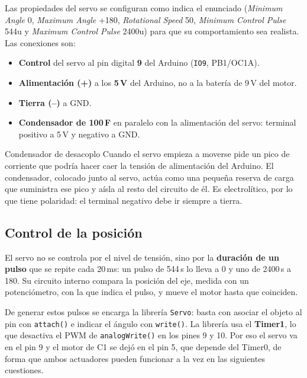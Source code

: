 \documentclass{upo-master}
\begin{document}
Las propiedades del servo se configuran como indica el enunciado
(\emph{Minimum Angle} 0, \emph{Maximum Angle} +180, \emph{Rotational Speed} 50,
\emph{Minimum Control Pulse} 544u y \emph{Maximum Control Pulse} 2400u) para
que su comportamiento sea realista. Las conexiones son:
\begin{itemize}
  \item \textbf{Control} del servo al pin digital \textbf{9} del Arduino
        (\texttt{IO9}, PB1/OC1A).
  \item \textbf{Alimentación (+)} a los \textbf{5\,V} del Arduino, no a la
        batería de 9\,V del motor.
  \item \textbf{Tierra (--)} a GND.
  \item \textbf{Condensador de 100\,\textmu F} en paralelo con la alimentación
        del servo: terminal positivo a 5\,V y negativo a GND.
\end{itemize}

\begin{concepto}{Condensador de desacoplo}
Cuando el servo empieza a moverse pide un pico de corriente que podría hacer
caer la tensión de alimentación del Arduino. El condensador, colocado junto al
servo, actúa como una pequeña reserva de carga que suministra ese pico y
aísla al resto del circuito de él. Es electrolítico, por lo que tiene
polaridad: el terminal negativo debe ir siempre a tierra.
\end{concepto}


\subsection{Control de la posición}

El servo no se controla por el nivel de tensión, sino por la \textbf{duración
de un pulso} que se repite cada 20\,ms: un pulso de 544\,\textmu s lo lleva a
0\textdegree{} y uno de 2400\,\textmu s a 180\textdegree. Su circuito interno
compara la posición del eje, medida con un potenciómetro, con la que indica el
pulso, y mueve el motor hasta que coinciden.

De generar estos pulsos se encarga la librería \texttt{Servo}: basta con
asociar el objeto al pin con \texttt{attach()} e indicar el ángulo con
\texttt{write()}. La librería usa el \textbf{Timer1}, lo que desactiva el PWM
de \texttt{analogWrite()} en los pines 9 y 10. Por eso el servo va en el pin 9
y el motor de C1 se dejó en el pin 5, que depende del Timer0, de forma que
ambos actuadores pueden funcionar a la vez en las siguientes cuestiones.
\end{document}

